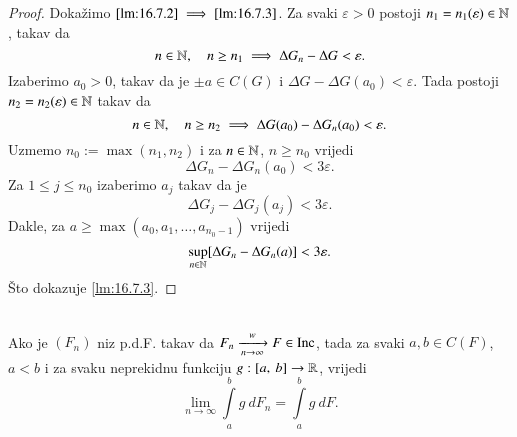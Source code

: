 \begin{proof}
    Doka\v zimo $\ref{lm:16.7.2} \implies \ref{lm:16.7.3}$.
    Za svaki $\varepsilon > 0$ postoji $n_1 = n_1 (\varepsilon) \in \mathbb{N}$, takav da
    \begin{equation*}
        n \in \mathbb{N}, \quad n \geq n_1 \implies \Delta G_n - \Delta G < \varepsilon.
    \end{equation*}
    Izaberimo $a_0 > 0$, takav da je $\pm a \in C(G)$ i $\Delta G - \Delta G (a_0) < \varepsilon$.
    Tada postoji $n_2 = n_2 (\varepsilon) \in \mathbb{N}$ takav da
    \begin{equation*}
        n \in \mathbb{N}, \quad n \geq n_2 \implies \Delta G (a_0) - \Delta G_n (a_0) < \varepsilon.
    \end{equation*}
    Uzmemo $n_0 := \max (n_1, n_2)$ i za $n \in \mathbb{N}$, $n \geq n_0$ vrijedi
    \begin{equation*}
        \Delta G_n - \Delta G_n (a_0) < 3 \varepsilon.
    \end{equation*}
    Za $1 \leq j \leq n_0$ izaberimo $a_j$ takav da je
    \begin{equation*}
        \Delta G_j - \Delta G_j (a_j) < 3 \varepsilon.
    \end{equation*}
    Dakle, za $a \geq \max (a_0, a_1, \ldots, a_{n_0 - 1})$ vrijedi
    \begin{equation*}
        \sup\limits_{n \in \mathbb{N}} [ \Delta G_n - \Delta G_n (a) ] < 3 \varepsilon.
    \end{equation*}
    \v Sto dokazuje \ref{lm:16.7.3}.
\end{proof}

\begin{tm}  \label{tm:16.8}
    \quad \\
    Ako je $(F_n)$ niz p.d.F. takav da $F_n \xrightarrow[n \to \infty]{w} F \in \mathrm{Inc}$, tada za svaki $a, b \in C(F)$, $a < b$ i za svaku neprekidnu funkciju $g : [{a}, \:{b}] \to \mathbb{R}$, vrijedi
    \begin{equation*}
        \lim\limits_{n \to \infty} \int\limits_a^b g \: d F_n = \int\limits_a^b g \: d F.
    \end{equation*}
\end{tm}


